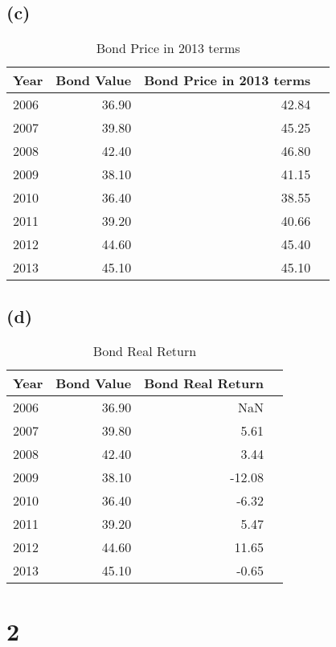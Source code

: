    \subsection{(c)}\label{c}

\begin{table}[H]
\centering
\caption{Bond Price in 2013 terms}
\label{tab:bond_price_in_2013_terms}
\begin{tabular}{lrrr}
\toprule
Year & Bond Value & Bond Price in 2013 terms \\
\midrule
2006 & 36.90 & 42.84 \\
2007 & 39.80 & 45.25 \\
2008 & 42.40 & 46.80 \\
2009 & 38.10 & 41.15 \\
2010 & 36.40 & 38.55 \\
2011 & 39.20 & 40.66 \\
2012 & 44.60 & 45.40 \\
2013 & 45.10 & 45.10 \\
\bottomrule
\end{tabular}
\end{table}



    \subsection{(d)}\label{d}

\begin{table}[H]
\centering
\caption{Bond Real Return}
\label{tab:bond_real_return}
\begin{tabular}{lrrr}
\toprule
Year & Bond Value & Bond Real Return \\
\midrule
2006 & 36.90 & NaN \\
2007 & 39.80 & 5.61 \\
2008 & 42.40 & 3.44 \\
2009 & 38.10 & -12.08 \\
2010 & 36.40 & -6.32 \\
2011 & 39.20 & 5.47 \\
2012 & 44.60 & 11.65 \\
2013 & 45.10 & -0.65 \\
\bottomrule
\end{tabular}
\end{table}



    \section{2}\label{section}

